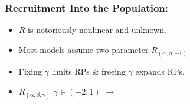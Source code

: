 \documentclass[a0paper,portrait]{baposter}
\begin{document}
\begin{poster}
{\begin{minipage}[h!]{0.55\textwidth}
	\subsubsection*{Recruitment Into the Population:}
        \begin{minipage}[b]{0.5\textwidth}
	\begin{itemize}[leftmargin=*]
		\raggedright	
		\item $R$ is notoriously nonlinear and unknown.%
		\item Most models assume two-parameter $R_{(\alpha, \beta, -1)}$ 
		\item Fixing $\gamma$ limits RPs \& freeing $\gamma$ expands RPs.	
		\item $R_{(\alpha, \beta, \gamma)}$ $\gamma\in(-2,1)$ $\bm{\longrightarrow}$%
	\end{itemize}
	$~$\\$~$\\$~$\\
	\end{minipage}
	\begin{minipage}[b]{0.48\textwidth}
		$~$\\

\end{minipage}
\end{minipage}}
\end{poster}
\end{document}
